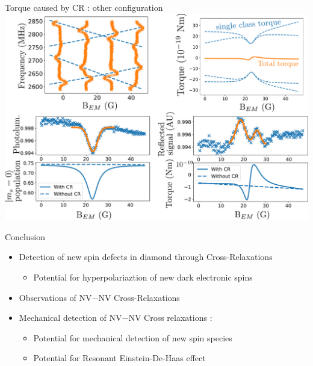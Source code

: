 \documentclass{beamer}
\begin{document}
\begin{frame}{Torque caused by CR : other configuration}
\centering
\includegraphics[scale=.28]{CRmeca_22}
\end{frame}
\begin{frame}{Conclusion}
\begin{itemize}
\setlength\itemsep{1em}
\item{Detection of new spin defects in diamond through Cross-Relaxations
\begin{itemize}
\item Potential for hyperpolariaztion of new dark electronic spins
\end{itemize}}
\item{Observations of NV$-$NV Cross-Relaxations}
\item{Mechanical detection of NV$-$NV Cross relaxations :
\begin{itemize}
\item Potential for mechanical detection of new spin species
\item Potential for Resonant Einstein-De-Haas effect 
\end{itemize} }
\end{itemize}
\end{frame}
\end{document}
